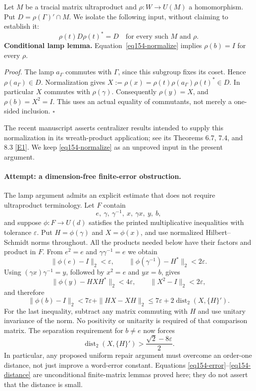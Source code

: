 \documentclass[11pt,a4paper]{article}
\newcommand{\eps}{\varepsilon}
\newcommand{\eref}[2]{\hyperlink{extra:#1:#2}{[E#2]}}
\numberwithin{equation}{section}
\begin{document}
Let $M$ be a tracial matrix ultraproduct and $\rho:W\to U(M)$ a
homomorphism. Put $D=\rho(\Gamma)'\cap M$.
We isolate the following input, without claiming to establish it:
\begin{equation}\label{eq154-normalize}
 \rho(t)D\rho(t)^*=D
 \quad\text{for every such }M\text{ and }\rho.
\end{equation}
\textbf{Conditional lamp lemma.} Equation~\eqref{eq154-normalize} implies
$\rho(b)=I$ for every $\rho$.

\textit{Proof.} The lamp $a_\Gamma$ commutes with $\Gamma$, since this
subgroup fixes its coset. Hence $\rho(a_\Gamma)\in D$. Normalization gives
$X:=\rho(x)=\rho(t)\rho(a_\Gamma)\rho(t)^*\in D$. In particular $X$
commutes with $\rho(\gamma)$. Consequently
$\rho(y)=X$, and $\rho(b)=X^2=I$. This uses an actual equality of
commutants, not merely a one-sided inclusion. \hfill$\square$

The recent manuscript asserts centralizer results intended to supply this
normalization in its wreath-product application; see its Theorems 6.7, 7.4,
and 8.3 \eref{30006756}{1}. We keep \eqref{eq154-normalize} as an unproved input
in the present argument.

\paragraph{Attempt: a dimension-free finite-error obstruction.}
The lamp argument admits an explicit estimate that does not require
ultraproduct terminology. Let $F$ contain
\[
 e,\ \gamma,\ \gamma^{-1},\ x,\ \gamma x,\ y,\ b,
\]
and suppose $\phi:F\to U(d)$ satisfies the printed multiplicative
inequalities with tolerance $\eps$. Put $H=\phi(\gamma)$ and
$X=\phi(x)$, and use normalized Hilbert--Schmidt norms throughout.
All the products needed below have their factors and product in $F$.
From $e^2=e$ and $\gamma\gamma^{-1}=e$ we obtain
\[
 \|\phi(e)-I\|_2<\eps,\qquad
 \|\phi(\gamma^{-1})-H^*\|_2<2\eps.
\]
Using $(\gamma x)\gamma^{-1}=y$, followed by $x^2=e$ and $yx=b$, gives
\[
 \|\phi(y)-HXH^*\|_2<4\eps,\qquad
 \|X^2-I\|_2<2\eps,
\]
and therefore
\begin{equation}\label{eq154-error}
 \|\phi(b)-I\|_2
 <7\eps+\|HX-XH\|_2
 \le 7\eps+2\operatorname{dist}_2(X,\{H\}').
\end{equation}
For the last inequality, subtract any matrix commuting with $H$ and use
unitary invariance of the norm. No positivity or unitarity is required of
that comparison matrix. The separation requirement for $b\ne e$ now
forces
\begin{equation}\label{eq154-distance}
 \operatorname{dist}_2(X,\{H\}')>
 \frac{\sqrt2-8\eps}{2}.
\end{equation}
In particular, any proposed uniform repair argument must overcome an
order-one distance, not just improve a word-error constant. Equations
\eqref{eq154-error}--\eqref{eq154-distance} are unconditional finite-matrix
lemmas proved here; they do not assert that the distance is small.
\end{document}
